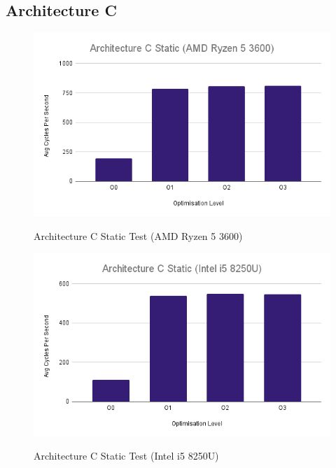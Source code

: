 \documentclass{article}
\begin{document}
\subsection{Architecture C}
\begin{figure}[!h]
\centering
\includegraphics[scale=0.5]{Architecture C Static (AMD Ryzen 5 3600).png}
\label{arch_c_static_pc}
\caption{Architecture C Static Test (AMD Ryzen 5 3600)}
\end{figure}

\begin{figure}[!h]
\centering
\includegraphics[scale=0.5]{Architecture C Static (Intel i5 8250U).png}
\label{arch_c_static_laptop}
\caption{Architecture C Static Test (Intel i5 8250U)}
\end{figure}
\end{document}
